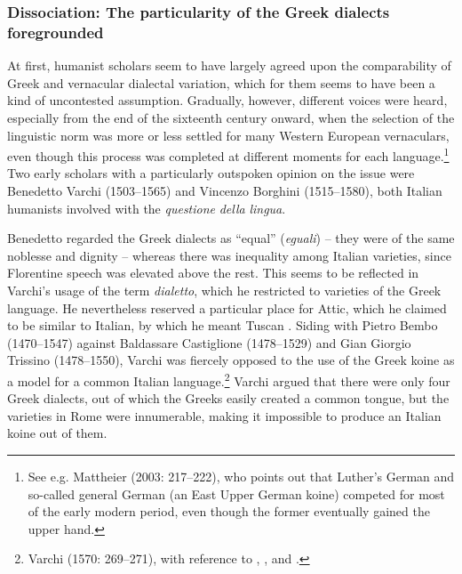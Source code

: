 \documentclass[output=paper]{langsci/langscibook}
\begin{document}
\subsubsection{Dissociation: The particularity of the Greek dialects foregrounded}
\hypertarget{Toc19704861}{}
At first, humanist scholars seem to have largely agreed upon the comparability of Greek and vernacular dialectal variation, which for them seems to have been a kind of uncontested assumption. Gradually, however, different voices were heard, especially from the end of the sixteenth century onward, when the selection of the linguistic norm was more or less settled for many Western European vernaculars, even though this process was completed at different moments for each language.\footnote{See e.g. Mattheier (2003: 217–222), who points out that Luther’s German and so-called general German (an East Upper German koine) competed for most of the early modern period, even though the former eventually gained the upper hand.} Two early scholars with a particularly outspoken opinion on the issue were Benedetto Varchi (1503–1565) and Vincenzo Borghini (1515–1580), both Italian humanists involved with the \textit{questione} \textit{della} \textit{lingua}.

Benedetto \citet[95]{Varchi1570} regarded the Greek dialects as “equal” (\textit{eguali}) – they were of the same noblesse and dignity – whereas there was inequality among Italian varieties, since Florentine speech was elevated above the rest. This seems to be reflected in Varchi’s usage of the term \textit{dialetto}, which he restricted to varieties of the Greek language. He nevertheless reserved a particular place for Attic, which he claimed to be similar to Italian, by which he meant Tuscan \citep[141]{Varchi1570}. Siding with Pietro Bembo (1470–1547) against Baldassare Castiglione (1478–1529) and Gian Giorgio Trissino (1478–1550), Varchi was fiercely opposed to the use of the Greek koine as a model for a common Italian language.\footnote{Varchi (1570: 269–271), with reference to \citet{Bembo1525}, \citet{Castiglione1528}, and \citet{Trissino1529}.} Varchi argued that there were only four Greek dialects, out of which the Greeks easily created a common tongue, but the varieties in Rome were innumerable, making it impossible to produce an Italian koine out of them.
\end{document}
